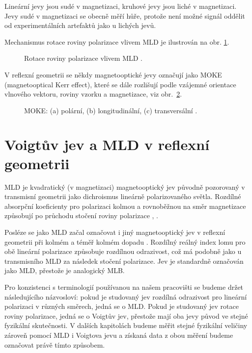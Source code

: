 Lineární jevy jsou sudé v magnetizaci, kruhové jevy jsou liché v magnetizaci. Jevy sudé v magnetizaci se obecně měří hůře, protože není možné signál oddělit od experimentálních artefaktů jako u lichých jevů.


Mechanismus rotace roviny polarizace vlivem MLD je ilustrován na obr. \ref{mld_subrt}.

\begin{figure}[htbp]\centering
	\caption{Rotace roviny polarizace vlivem MLD \cite{Subrt}.}\label{mld_subrt}
\end{figure}

V reflexní geometrii se někdy magnetooptické jevy označují jako MOKE (magnetooptical Kerr effect), které se dále rozlišují podle vzájemné orientace vlnového vektoru, roviny vzorku a magnetizace, viz obr.~\ref{kerr_subrt}.

\begin{figure}[htbp]\centering
{}
	\caption{MOKE: (a) polární, (b) longitudinální, (c) transversální \cite{Subrt}.}\label{kerr_subrt}
\end{figure}

\section{Voigtův jev a MLD v reflexní geometrii} \label{kap_VoigtMLD}

MLD je kvadratický (v magnetizaci) magnetooptický jev původně pozorovaný v transmisní geometrii jako dichroismus lineárně polarizovaného světla. Rozdílné absorpční koeficienty pro polarizaci kolmou a rovnoběžnou na směr magnetizace způsobují po průchodu stočení roviny polarizace \cite{cit1}, \cite{cit2}. 

Posléze se jako MLD začal označovat i jiný magnetooptický jev v reflexní geometrii při kolmém a téměř kolmém dopadu \cite{cit3}. Rozdílný reálný index lomu pro obě lineární polarizace způsobuje rozdílnou odrazivost, což má podobně jako u transmisního MLD za následek stočení polarizace. Jev je standardně označován jako MLD, přestože je analogický MLB.

Pro konzistenci s terminologií používanou na našem pracovišti se budeme držet následujícího názvosloví: pokud je studovaný jev rozdílná odrazivost pro lineární polarizaci v různých směrech, jedná se o MLD. Pokud je studovaný jev rotace roviny polarizace, jedná se o Voigtův jev, přestože mají oba jevy původ ve stejné fyzikální skutečnosti. V dalších kapitolách budeme měřit stejné fyzikální veličiny zároveň pomocí MLD i Voigtova jevu a získaná data z obou měření budeme označovat právě tímto způsobem.

